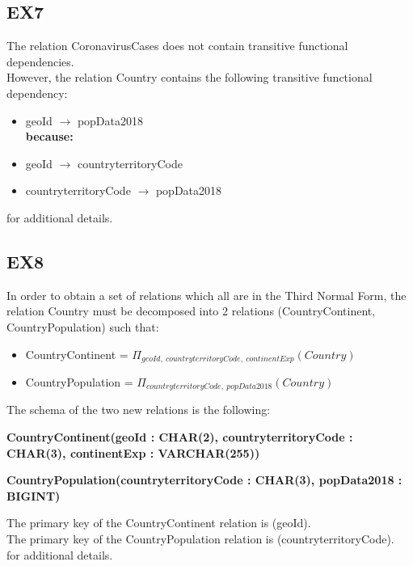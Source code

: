 \documentclass{article}
\begin{document}
\subsection{EX7}
The relation CoronavirusCases does not contain transitive functional dependencies.\\
However, the relation Country contains the following transitive functional dependency:
\begin{itemize}
    \item geoId $\rightarrow$ popData2018\\
    \textbf{because:}
    \item geoId $\rightarrow$ countryterritoryCode
    \item countryterritoryCode $\rightarrow$ popData2018
\end{itemize}
\textcolor{blue}{} for additional details.



\subsection{EX8}
In order to obtain a set of relations which all are in the Third Normal Form, the relation Country must be decomposed into 2 relations (CountryContinent, CountryPopulation) such that:
\begin{itemize}
    \item CountryContinent = $\Pi_{geoId, \:countryterritoryCode, \:continentExp}(Country)$
    
    \item CountryPopulation = $\Pi_{countryterritoryCode,\: popData2018}(Country)$
    
\end{itemize}
The schema of the two new relations is the following:
\begin{center}
    
    \textbf{CountryContinent(geoId : CHAR(2), countryterritoryCode : CHAR(3), continentExp : VARCHAR(255))}
\end{center}
\begin{center}
    \textbf{CountryPopulation(countryterritoryCode : CHAR(3), popData2018 : BIGINT)}
\end{center}
The primary key of the CountryContinent relation is (geoId).\\
The primary key of the CountryPopulation relation is (countryterritoryCode).\\
\textcolor{blue}{} for additional details.
\end{document}

